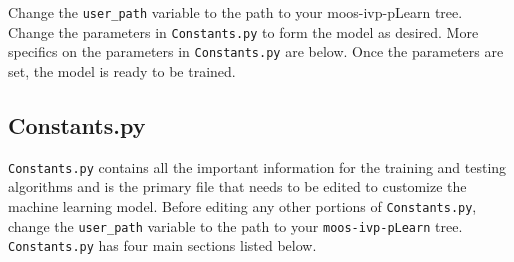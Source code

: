 \documentclass[onecolumn,letterpaper,11pt]{article}
\begin{document}
Change the \texttt{user\_path} variable to the path to your moos-ivp-pLearn tree. Change the parameters in \texttt{Constants.py} to form the model as desired. More specifics on the parameters in \texttt{Constants.py} are below. Once the parameters are set, the model is ready to be trained. 

\subsection{Constants.py}
\texttt{Constants.py} contains all the important information for the training and testing algorithms and is the primary file that needs to be edited to customize the machine learning model. Before editing any other portions of \texttt{Constants.py}, change the \texttt{user\_path} variable to the path to your \texttt{moos-ivp-pLearn} tree. \texttt{Constants.py} has four main sections listed below.
\end{document}
